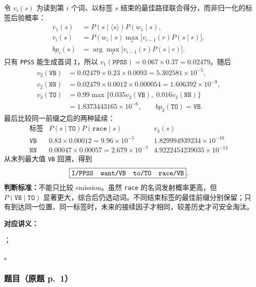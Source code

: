 \begin{checkedsolution}
\nopagebreak[4]
令 $v_i(s)$ 为读到第 $i$ 个词、以标签 $s$ 结束的最佳路径联合得分，而非归一化的标签后验概率：
\begin{align*}
v_1(s)&=P(s\mid\langle s\rangle)P(w_1\mid s),\\
v_i(s)&=P(w_i\mid s)\max_r\bigl[v_{i-1}(r)P(s\mid r)\bigr],\\
bp_i(s)&=\arg\max_r\bigl[v_{i-1}(r)P(s\mid r)\bigr].
\end{align*}
只有 \texttt{PPSS} 能生成首词 \texttt{I}，所以 $v_1(\texttt{PPSS})=0.067\times0.37=0.02479$。随后
\begin{align*}
v_2(\texttt{VB})&=0.02479\times0.23\times0.0093=5.302581\times10^{-5},\\
v_2(\texttt{NN})&=0.02479\times0.0012\times0.000054=1.606392\times10^{-9},\\
v_3(\texttt{TO})&=0.99\max\{0.035v_2(\texttt{VB}),\;0.016v_2(\texttt{NN})\}\\
&=1.8373443165\times10^{-6},\qquad bp_3(\texttt{TO})=\texttt{VB}.
\end{align*}
最后比较同一前缀之后的两种延续：
\[
\begin{array}{c|c|c}
\text{标签} & P(s\mid\texttt{TO})P(\texttt{race}\mid s) & v_4(s)\\
\hline
\texttt{VB} & 0.83\times0.00012=9.96\times10^{-5} & 1.829994939234\times10^{-10}\\
\texttt{NN} & 0.00047\times0.00057=2.679\times10^{-7} & 4.9222454239035\times10^{-13}
\end{array}
\]
从末列最大值 \texttt{VB} 回溯，得到
\[
\boxed{\texttt{I/PPSS\quad want/VB\quad to/TO\quad race/VB}}.
\]
\textbf{判断标准：}不能只比较 emission。虽然 \texttt{race} 的名词发射概率更高，但 $P(\texttt{VB}\mid\texttt{TO})$ 显著更大，综合后仍选动词。不同结束标签的最佳前缀分别保留；只有到达同一位置、同一标签时，未来的接续因子才相同，较差历史才可安全淘汰。
\end{checkedsolution}


\textbf{对应讲义：}\par
{}；\par
{}。

\subsubsection*{题目（原题 p.~1）}

